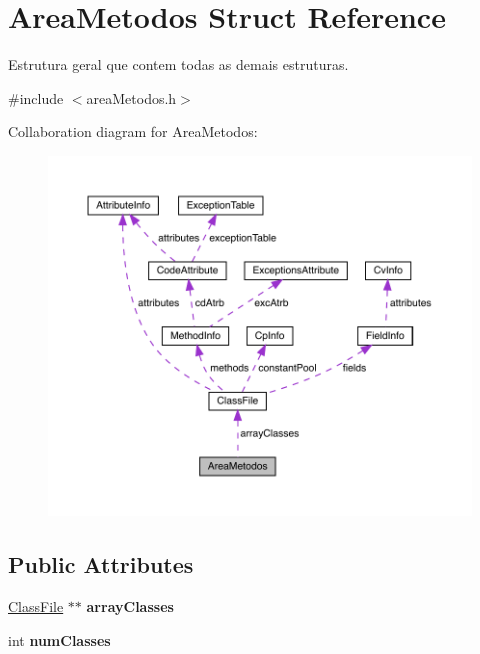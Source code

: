 \hypertarget{structAreaMetodos}{}\section{Area\+Metodos Struct Reference}
\label{structAreaMetodos}


Estrutura geral que contem todas as demais estruturas.  




{\ttfamily \#include $<$area\+Metodos.\+h$>$}



Collaboration diagram for Area\+Metodos\+:
\nopagebreak
\begin{figure}[H]
\begin{center}
\leavevmode
\includegraphics[width=350pt]{structAreaMetodos__coll__graph}
\end{center}
\end{figure}
\subsection*{Public Attributes}
\begin{DoxyCompactItemize}
\item 
\mbox{\label{structAreaMetodos_a2f53ae03ffa9b13b9866efb46811c988}} 
\mbox{\hyperlink{structClassFile}{Class\+File}} $\ast$$\ast$ {\bfseries array\+Classes}
\item 
\mbox{\label{structAreaMetodos_a16f79347136c9dda54c97a62bd596887}} 
int {\bfseries num\+Classes}
\end{DoxyCompactItemize}


